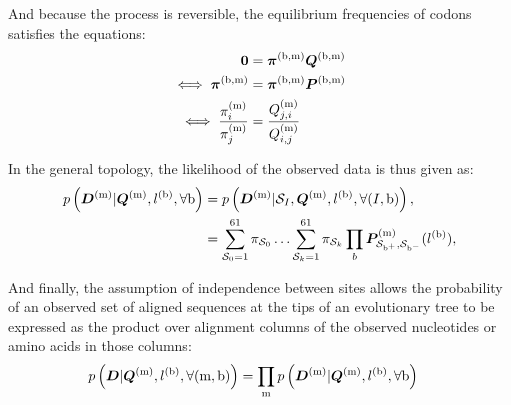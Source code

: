 And because the process is reversible, the equilibrium frequencies of \glspl{codon} satisfies the equations:
\begin{align}
\bm{0} & = \bm{\pi}^{(\text{b}, \text{m})} \bm{Q}^{(\text{b}, \text{m})} \\
\iff \bm{\pi}^{(\text{b}, \text{m})} & = \bm{\pi}^{(\text{b}, \text{m})} \bm{P}^{(\text{b}, \text{m})} \\
\iff \dfrac{\pi_{{i}}^{(\text{m})}}{\pi_{{j}}^{(\text{m})}} & = \dfrac{Q_{{j}, {i}}^{(\text{m})}}{Q_{{i}, {j}}^{(\text{m})}}
\end{align}

In the general topology, the \gls{likelihood} of the observed data is thus given as:
\begin{align}
p\left(\bm{D}^{(\text{m})}| \bm{Q}^{(\text{m})}, l^{(\text{b})}, \forall \text{b} \right) & = p\left(\bm{D}^{(\text{m})}| \mathcal{S}_{I}, \bm{Q}^{(\text{m})}, l^{(\text{b})}, \forall (I, \text{b}) \right), \\
& = \sum_{\mathcal{S}_{0}=1}^{61} \pi_{\mathcal{S}_{0}} \hdots \sum_{\mathcal{S}_{k}=1}^{61} \pi_{\mathcal{S}_{k}} \prod_{b} \bm{P}^{(\text{m})}_{\mathcal{S}_{\text{b}^{+}}, \mathcal{S}_{\text{b}^{-}}}(l^{(\text{b})}), \label{eq:likelihood-site}
\end{align}

And finally, the assumption of independence between sites allows the probability of an observed set of aligned sequences at the tips of an evolutionary tree to be expressed as the product over alignment columns of the observed nucleotides or amino acids in those columns:
\begin{align}
p\left(\bm{D}| \bm{Q}^{(\text{m})}, l^{(\text{b})}, \forall (\text{m}, \text{b}) \right) & = \prod_{\text{m}} p\left(\bm{D}^{(\text{m})}| \bm{Q}^{(\text{m})}, l^{(\text{b})}, \forall \text{b} \right) \label{eq:likelihood}
\end{align} 
